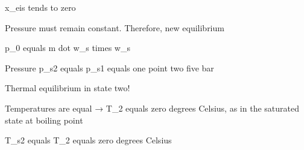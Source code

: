 x_eis tends to zero

Pressure must remain constant. Therefore, new equilibrium

p_0 equals m dot w_s times w_s

Pressure p_s2 equals p_s1 equals one point two five bar

Thermal equilibrium in state two!

Temperatures are equal → T_2 equals zero degrees Celsius, as in the saturated state at boiling point

T_s2 equals T_2 equals zero degrees Celsius